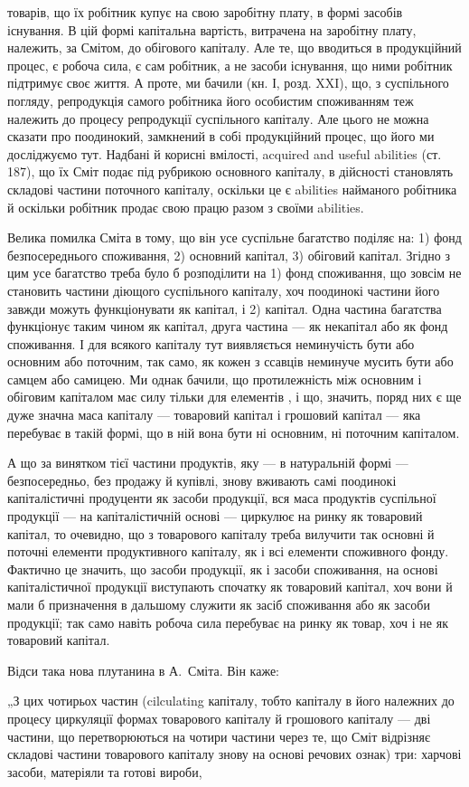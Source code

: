 \parcont{}  %
товарів, що їх робітник купує на свою заробітну плату, в формі засобів
існування. В цій формі капітальна вартість, витрачена на заробітну плату,
належить, за Смітом, до обігового капіталу. Але те, що вводиться в
продукційний процес, є робоча сила, є сам робітник, а не засоби існування,
що ними робітник підтримує своє життя. А проте, ми бачили
(кн. І, розд. XXI), що, з суспільного погляду, репродукція самого робітника
його особистим споживанням теж належить до процесу репродукції
суспільного капіталу. Але цього не можна сказати про поодинокий,
замкнений в собі продукційний процес, що його ми досліджуємо тут.
Надбані й корисні вмілості, acquired and useful abilities (ст. 187), що їх
Сміт подає під рубрикою основного капіталу, в дійсності становлять
складові частини поточного капіталу, оскільки це є abilities найманого
робітника й оскільки робітник продає свою працю разом з своїми abilities.

Велика помилка Сміта в тому, що він усе суспільне багатство поділяє
на: 1) фонд безпосереднього споживання, 2) основний капітал,
3) обіговий капітал. Згідно з цим усе багатство треба було б розподілити
на 1) фонд споживання, що зовсім не становить частини діющого
суспільного капіталу, хоч поодинокі частини його завжди можуть функціонувати
як капітал, і 2) капітал. Одна частина багатства функціонує
таким чином як капітал, друга частина — як некапітал або як фонд
споживання. І для всякого капіталу тут виявляється неминучість бути
або основним або поточним, так само, як кожен з ссавців неминуче мусить
бути або самцем або самицею. Ми однак бачили, що протилежність
між основним і обіговим капіталом має силу тільки для елементів , і що, значить, поряд них є ще дуже значна
маса капіталу — товаровий капітал і грошовий капітал — яка перебуває в
такій формі, що в ній  вона бути ні основним, ні поточним
капіталом.

А що за винятком тієї частини продуктів, яку — в натуральній формі —
безпосередньо, без продажу й купівлі, знову вживають самі поодинокі
капіталістичні продуценти як засоби продукції, вся маса продуктів суспільної
продукції — на капіталістичній основі — циркулює на ринку як
товаровий капітал, то очевидно, що з товарового капіталу треба вилучити
так основні й поточні елементи продуктивного капіталу, як і всі
елементи споживного фонду. Фактично це значить, що засоби продукції,
як і засоби споживання, на основі капіталістичної продукції виступають
спочатку як товаровий капітал, хоч вони й мали б призначення в
дальшому служити як засіб споживання або як засоби продукції; так само
навіть робоча сила перебуває на ринку як товар, хоч і не як товаровий
капітал.

Відси така нова плутанина в А.~Сміта. Він каже:

„З цих чотирьох частин (cilculating капіталу, тобто капіталу в його
належних до процесу циркуляції формах товарового капіталу й грошового
капіталу — дві частини, що перетворюються на чотири частини через
те, що Сміт відрізняє складові частини товарового капіталу знову на
основі речових ознак) три: харчові засоби, матеріяли та готові вироби,
\parbreak{}  %
